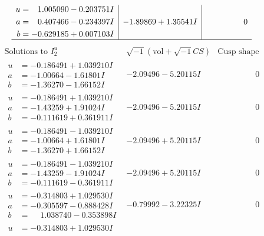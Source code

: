 \documentclass[1p]{elsarticle_modified}
\theoremstyle{definition}
\newcommand{\I}{\sqrt{-1}}
\begin{document}
$$\begin{array}{c|c|c}
\begin{aligned}
u &= \phantom{-}1.005090 - 0.203751 I \\
a &= \phantom{-}0.407466 - 0.234397 I \\
b &= -0.629185 + 0.007103 I\end{aligned}
 & -1.89869 + 1.35541 I & \phantom{-0.000000 } 0\\
 \hline 
 \end{array}$$\newpage$$\begin{array}{c|c|c}  
\text{Solutions to }I^u_{2}& \I (\text{vol} + \sqrt{-1}CS) & \text{Cusp shape}\\
 \hline 
\begin{aligned}
u &= -0.186491 + 1.039210 I \\
a &= -1.00664 - 1.61801 I \\
b &= -1.36270 - 1.66152 I\end{aligned}
 & -2.09496 - 5.20115 I & \phantom{-0.000000 } 0 \\ \hline\begin{aligned}
u &= -0.186491 + 1.039210 I \\
a &= -1.43259 + 1.91024 I \\
b &= -0.111619 + 0.361911 I\end{aligned}
 & -2.09496 - 5.20115 I & \phantom{-0.000000 } 0 \\ \hline\begin{aligned}
u &= -0.186491 - 1.039210 I \\
a &= -1.00664 + 1.61801 I \\
b &= -1.36270 + 1.66152 I\end{aligned}
 & -2.09496 + 5.20115 I & \phantom{-0.000000 } 0 \\ \hline\begin{aligned}
u &= -0.186491 - 1.039210 I \\
a &= -1.43259 - 1.91024 I \\
b &= -0.111619 - 0.361911 I\end{aligned}
 & -2.09496 + 5.20115 I & \phantom{-0.000000 } 0 \\ \hline\begin{aligned}
u &= -0.314803 + 1.029530 I \\
a &= -0.305597 - 0.888428 I \\
b &= \phantom{-}1.038740 - 0.353898 I\end{aligned}
 & -0.79992 - 3.22325 I & \phantom{-0.000000 } 0 \\ \hline\begin{aligned}
u &= -0.314803 + 1.029530 I \\

\end{aligned}
\end{array}$$
\end{document}
